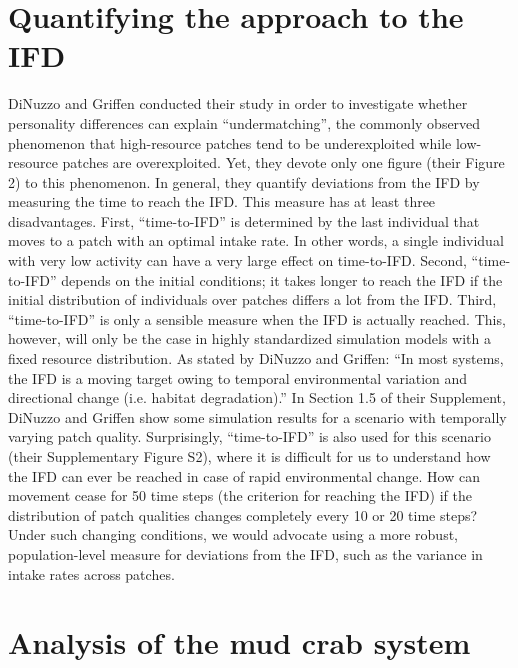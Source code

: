 \begin{refsection}
	\section*{Quantifying the approach to the IFD}
	
	DiNuzzo and Griffen conducted their study in order to investigate whether personality differences can explain ``undermatching'', the commonly observed phenomenon that high-resource patches tend to be underexploited while low-resource patches are overexploited.
	Yet, they devote only one figure (their Figure 2) to this phenomenon.
	In general, they quantify deviations from the IFD by measuring the time to reach the IFD.
	This measure has at least three disadvantages.
	First, ``time-to-IFD'' is determined by the last individual that moves to a patch with an optimal intake rate.
	In other words, a single individual with very low activity can have a very large effect on time-to-IFD.
	Second, ``time-to-IFD'' depends on the initial conditions; it takes longer to reach the IFD if the initial distribution of individuals over patches differs a lot from the IFD.
	Third, ``time-to-IFD'' is only a sensible measure when the IFD is actually reached.
	This, however, will only be the case in highly standardized simulation models with a fixed resource distribution.
	As stated by DiNuzzo and Griffen: ``In most systems, the IFD is a moving target owing to temporal environmental variation and directional change (i.e. habitat degradation).'' 
	In Section 1.5 of their Supplement, DiNuzzo and Griffen show some simulation results for a scenario with temporally varying patch quality.
	Surprisingly, ``time-to-IFD'' is also used for this scenario (their Supplementary Figure S2), where it is difficult for us to understand how the IFD can ever be reached in case of rapid environmental change.
	How can movement cease for 50 time steps (the criterion for reaching the IFD) if the distribution of patch qualities changes completely every 10 or 20 time steps? Under such changing conditions, we would advocate using a more robust, population-level measure for deviations from the IFD, such as the variance in intake rates across patches. 
	
	\section*{Analysis of the mud crab system}
	

\end{refsection}
